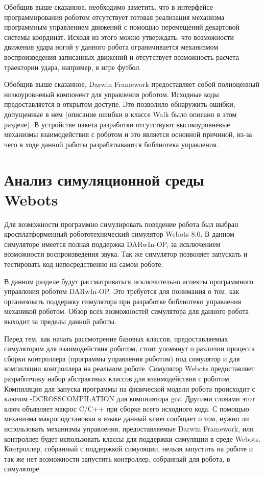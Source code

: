 Обобщив выше сказанное, необходимо заметить, что в интерфейсе программирования роботом отсутствует готовая реализация механизма программным управлением движений с помощью перемещений декартовой системы координат. Исходя из этого можно утверждать, что возможности движения удара ногой у данного робота ограничивается механизмом воспроизведения записанных движений и отсутствует возможность расчета траектории удара, например, в игре футбол.

Обобщив выше сказанное, Darwin Framework предоставляет собой полноценный низкоуровневый компонент для управления роботом. Исходные коды предоставляется в открытом доступе. Это позволило обнаружить ошибки, допущенные в нем (описание ошибки в классе Walk было описано в этом разделе). В устройстве пакета разработки отсутствуют высокоуровневые механизмы взаимодействия с роботом и это является основной причиной, из-за чего в ходе данной работы разрабатываются библиотека управления.

\section{Анализ симуляционной среды Webots}

Для возможности программно симулировать поведение робота был выбран кросплатформенный робототехнический симулятор Webots 8.0. В данном симуляторе имеется полная поддержка DARwIn-OP, за исключением возможности воспроизведения звука. Так же симулятор позволяет запускать и тестировать код непосредственно на самом роботе.

В данном разделе будут рассматриваться исключительно аспекты программного управления роботом DARwIn-OP. Это требуется для понимания о том, как организовать поддержку симулятора при разработке библиотеки управления механикой роботом. Обзор всех возможностей симулятора для данного робота выходит за пределы данной работы.

Перед тем, как начать рассмотрение базовых классов, предоставляемых симулятором для взаимодействия роботом, стоит упомянут о различии процесса сборки контроллера (программы управления роботом) под симулятор и для компиляции контроллера на реальном роботе. Симулятор Webots предоставляет разработчику набор абстрактных классов для взаимодействия с роботом. Компиляция для запуска программы на физической модели робота происходит с ключом -DCROSSCOMPILATION для компилятора gcc. Другими словами этот ключ объявляет макрос C/C++ при сборке всего исходного кода. С помощью механизма макроподстановки в языке данный ключ сообщает о том, нужно ли использовать механизмы управления, предоставляемые Darwin Framework, или контроллер будет использовать классы для поддержки симуляции в среде Webots. Контроллер, собранный с поддержкой симуляции, нельзя запустить на роботе и так же нет возможности запустить контроллер, собранный для робота, в симуляторе.

